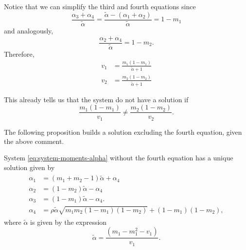Notice that we can simplify the third and fourth equations since 
$$
\frac{\alpha_3 + \alpha_4}{\tilde{\alpha}} = \frac{\tilde{\alpha} - (\alpha_1 + \alpha_2)}{\tilde{\alpha}} = 1 - m_1 
$$
and analogously, 
$$
\frac{\alpha_2 + \alpha_4}{\tilde{\alpha}} = 1 - m_2. 
$$
Therefore, 
\begin{align*}
    v_1 &= \frac{m_1(1 - m_1)}{\tilde{\alpha} + 1} \\
    v_2 &= \frac{m_2(1 - m_2)}{\tilde{\alpha} + 1}
\end{align*}

This already tells us that the system do not have a solution if 
$$
\frac{m_1(1-m_1)}{v_1} \neq \frac{m_2(1-m_2)}{v_2}. 
$$

The following proposition builds a solution excluding the fourth equation, given the above comment. 

\begin{proposition}
  \label{prop:solution-to-system-bivariate-beta}
  System \eqref{eq:system-moments-alpha} without the fourth equation has a unique solution given by 
\begin{gather}
 \label{eq:system-solution}
 \begin{aligned}
  \alpha_1 &= (m_1 + m_2 - 1)\tilde{\alpha} + \alpha_4 \\
  \alpha_2 &=  (1 - m_2)\tilde{\alpha} - \alpha_4 \\
  \alpha_3 &= (1-m_1)\tilde{\alpha} - \alpha_4. \\
  \alpha_4 &= \rho\tilde{\alpha}\sqrt{m_1m_2(1-m_1)(1-m_2)} + (1-m_1)(1-m_2),
\end{aligned}
\end{gather}
where $\tilde{\alpha}$ is given by the expression 
$$
\tilde{\alpha} = \frac{(m_1 - m_1^2 - v_1)}{v_1}.
$$
\end{proposition}


